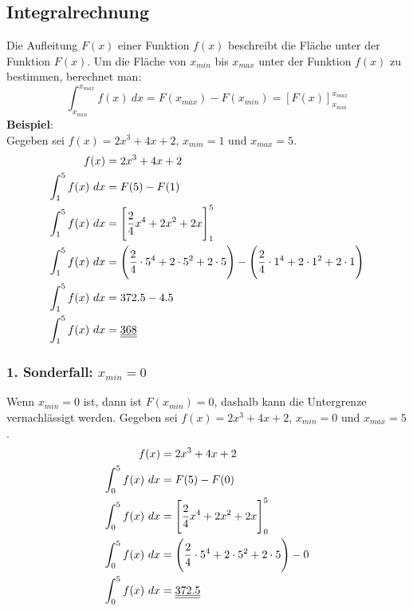 \documentclass[a4paper,12pt]{article}
\begin{document}
\subsection{Integralrechnung}
Die Aufleitung $F(x)$ einer Funktion $f(x)$ beschreibt die Fläche unter der Funktion $F(x)$.
Um die Fläche von $x_{min}$ bis $x_{max}$ unter der Funktion $f(x)$ zu bestimmen, berechnet man:
$$\int_{x_{min}}^{x_{max}} f(x)\ dx = F(x_{max}) - F(x_{min}) = [F(x)]_{x_{min}}^{x_{max}}$$
\textbf{Beispiel}:\\
Gegeben sei $f(x) = 2x^3 + 4x + 2$, $x_{min} = 1$ und $x_{max} = 5$.
\begin{equation}
\begin{split}
f(x) & = 2x^3 + 4x + 2\\
\int_1^5 f(x)\ dx & = F(5) - F(1)\\
\int_1^5 f(x)\ dx & = \Bigg{[}\frac{2}{4}x^4 + 2x^2 + 2x\Bigg{]}_1^5\\
\int_1^5 f(x)\ dx & = \Bigg{(}\frac{2}{4} \cdot 5^4 + 2\cdot 5^2 + 2 \cdot 5\Bigg{)} - \Bigg{(}\frac{2}{4} \cdot 1^4 + 2\cdot 1^2 + 2 \cdot 1\Bigg{)}\\
\int_1^5 f(x)\ dx & = 372.5 - 4.5\\
\int_1^5 f(x)\ dx & = \underline{\underline{368}}
\end{split}
\end{equation}
\subsubsection{1. Sonderfall: $x_{min} = 0$}
Wenn $x_{min} = 0$ ist, dann ist $F(x_{min}) = 0$, dashalb kann die Untergrenze vernachlässigt werden.
Gegeben sei $f(x) = 2x^3 + 4x + 2$, $x_{min} = 0$ und $x_{max} = 5$.
\begin{equation}
\begin{split}
f(x) & = 2x^3 + 4x + 2\\
\int_0^5 f(x)\ dx & = F(5) - F(0)\\
\int_0^5 f(x)\ dx & = \Bigg{[}\frac{2}{4}x^4 + 2x^2 + 2x\Bigg{]}_0^5\\
\int_0^5 f(x)\ dx & = \Bigg{(}\frac{2}{4} \cdot 5^4 + 2\cdot 5^2 + 2 \cdot 5\Bigg{)} - 0\\
\int_0^5 f(x)\ dx & = \underline{\underline{372.5}}
\end{split}
\end{equation}
\end{document}
